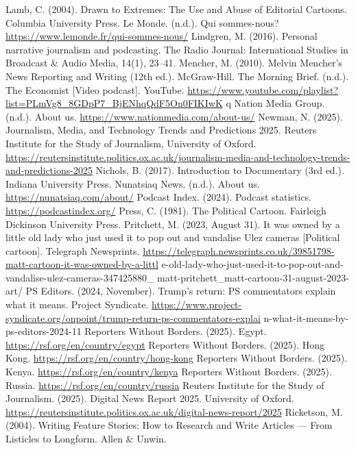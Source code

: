 \begin{referencelist}
   Lamb, C. (2004). Drawn to Extremes: The Use and Abuse of Editorial Cartoons. Columbia University Press.
   Le Monde. (n.d.). Qui sommes-nous? \url{https://www.lemonde.fr/qui-sommes-nous/}
   Lindgren, M. (2016). Personal narrative journalism and podcasting. The Radio Journal: International Studies in Broadcast \& Audio Media, 14(1), 23–41.
   Mencher, M. (2010). Melvin Mencher's News Reporting and Writing (12th ed.). McGraw-Hill.
   The Morning Brief. (n.d.). The Economist [Video podcast]. YouTube. \url{https://www.youtube.com/playlist?list=PLmVg8_8GDpP7_BjENhqQdF5On0FIKIwK} q
   Nation Media Group. (n.d.). About us. \url{https://www.nationmedia.com/about-us/}
   Newman, N. (2025). Journalism, Media, and Technology Trends and Predictions 2025. Reuters Institute for the Study of Journalism, University of Oxford. \url{https://reutersinstitute.politics.ox.ac.uk/journalism-media-and-technology-trends-and-predictions-2025}
   Nichols, B. (2017). Introduction to Documentary (3rd ed.). Indiana University Press.
   Nunatsiaq News. (n.d.). About us. \url{https://nunatsiaq.com/about/}
   Podcast Index. (2024). Podcast statistics. \url{https://podcastindex.org/}
   Press, C. (1981). The Political Cartoon. Fairleigh Dickinson University Press.
   Pritchett, M. (2023, August 31). It was owned by a little old lady who just used it to pop out and vandalise Ulez cameras [Political cartoon]. Telegraph Newsprints. \url{https://telegraph.newsprints.co.uk/39851798-matt-cartoon-it-was-owned-by-a-littl} e-old-lady-who-just-used-it-to-pop-out-and-vandalise-ulez-cameras-347425880\_ matt-pritchett\_matt-cartoon-31-august-2023-art/
   PS Editors. (2024, November). Trump's return: PS commentators explain what it means. Project Syndicate. \url{https://www.project-syndicate.org/onpoint/trump-return-ps-commentators-explai} n-what-it-means-by-ps-editors-2024-11
   Reporters Without Borders. (2025). Egypt. \url{https://rsf.org/en/country/egypt}
   Reporters Without Borders. (2025). Hong Kong. \url{https://rsf.org/en/country/hong-kong}
   Reporters Without Borders. (2025). Kenya. \url{https://rsf.org/en/country/kenya}
   Reporters Without Borders. (2025). Russia. \url{https://rsf.org/en/country/russia}
   Reuters Institute for the Study of Journalism. (2025). Digital News Report 2025. University of Oxford. \url{https://reutersinstitute.politics.ox.ac.uk/digital-news-report/2025}
   Ricketson, M. (2004). Writing Feature Stories: How to Research and Write Articles — From Listicles to Longform. Allen \& Unwin.

\end{referencelist}
